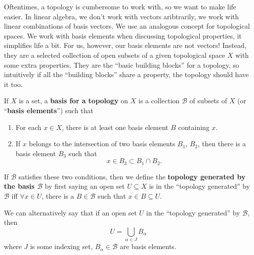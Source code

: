 \begin{prob}
Oftentimes, a topology is cumbersome to work with, so we want to
make life easier. In linear algebra, we don't work with vectors
aribtrarily, we work with linear combinations of basis
vectors. We use an analogous concept for topological spaces. We
work with basis elements when discussing topological properties,
it simplifies life a bit. For us, however, our basis elements are
not vectors! Instead, they are a selected collection of open
subsets of a given topological space $X$ with some extra
properties. They are the ``basic building blocks'' for a
topology, so intuitively if all the ``building blocks'' share a
property, the topology should have it too.
\end{prob}
\begin{defn}\label{defn:basisForTopology}
  If $X$ is a set, a \textbf{basis for a topology} on $X$ is a
  collection $\mathscr{B}$ of subsets of $X$ (or ``\textbf{basis elements}'') 
  such that 
\begin{enumerate}
\item For each $x\in X$, there is at least one basis element $B$
  containing $x$.
\item If $x$ belongs to the intersection of two basis elements
  $B_{1}$, $B_{2}$, then there is a basis element $B_{3}$ such
  that
\begin{equation}
x\in B_{3}\subset B_{1}\cap B_{2}.
\end{equation}
\end{enumerate}
If $\mathscr{B}$ satisfies these two conditions, then we define
the \textbf{topology generated by the basis $\mathscr{B}$} by
first saying an open set $U\subseteq X$ is in the ``topology generated'' by
$\mathscr{B}$ iff $\forall x\in U$, there is a $B\in\mathscr{B}$
such that $x\in B\subseteq U$.
\end{defn}
\begin{rmk}\label{rmk:topologyGenerated}
We can alternatively say that if an open set $U$ in the ``topology
generated'' by $\mathscr{B}$, then
\begin{equation}
U = \bigcup_{\alpha\in J}B_{\alpha}
\end{equation}
where $J$ is some indexing set, $B_{\alpha}\in\mathscr{B}$ are
basis elements.
\end{rmk}
